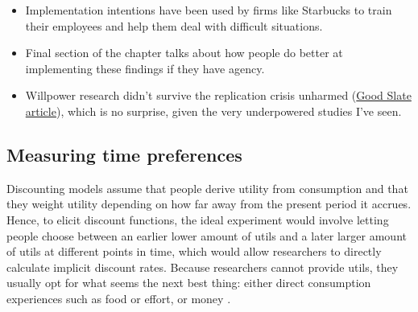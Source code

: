 \documentclass[a4paper, 11pt]{report}
\begin{document}
\begin{itemize}
\begin{itemize}
		\item Implementation intentions have been used by firms like Starbucks to train their employees and help them deal with difficult situations.

		\item Final section of the chapter talks about how people do better at implementing these findings if they have agency.

		\item Willpower research didn't survive the replication crisis unharmed (\href{http://www.slate.com/articles/health_and_science/cover_story/2016/03/ego_depletion_an_influential_theory_in_psychology_may_have_just_been_debunked.html?via=gdpr-consent}{Good Slate article}), which is no surprise, given the very underpowered studies I've seen.
	\end{itemize}
\end{itemize}


\subsection{Measuring time preferences}

Discounting models assume that people derive utility from consumption and that they weight utility depending on how far away from the present period it accrues. Hence, to elicit discount functions, the ideal experiment would involve letting people choose between an earlier lower amount of utils and a later larger amount of utils at different points in time, which would allow researchers to directly calculate implicit discount rates. Because researchers cannot provide utils, they usually opt for what seems the next best thing: either direct consumption experiences such as food or effort, or money \citet{frederick2002time,cohen2020measuring}.
\end{document}
